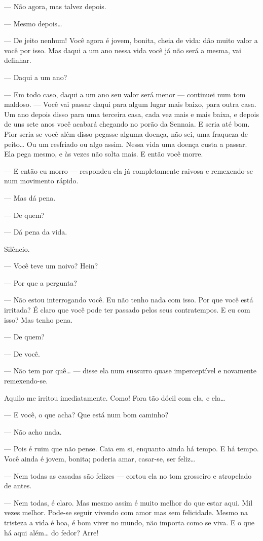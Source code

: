 --- Não agora, mas talvez depois.

--- Mesmo depois\ldots{}

--- De jeito nenhum! Você agora é jovem, bonita, cheia de vida: dão muito
valor a você por isso. Mas daqui a um ano nessa vida você já não será a
mesma, vai definhar.

--- Daqui a um ano?

--- Em todo caso, daqui a um ano seu valor será menor --- continuei num tom
maldoso. --- Você vai passar daqui para algum lugar mais baixo, para
outra casa. Um ano depois disso para uma terceira casa, cada vez mais e
mais baixa, e depois de uns sete anos você acabará chegando no porão da
Sennaia. E seria até bom. Pior seria se você além disso pegasse alguma
doença, não sei, uma fraqueza de peito\ldots{} Ou um resfriado ou algo
assim. Nessa vida uma doença custa a passar. Ela pega mesmo, e às vezes
não solta mais. E então você morre.

--- E então eu morro --- respondeu ela já completamente raivosa e
remexendo-se num movimento rápido.

--- Mas dá pena.

--- De quem?

--- Dá pena da vida.

Silêncio.

--- Você teve um noivo? Hein?

--- Por que a pergunta?

--- Não estou interrogando você. Eu não tenho nada com isso. Por que você
está irritada? É claro que você pode ter passado pelos seus
contratempos. E eu com isso? Mas tenho pena.

--- De quem?

--- De você.

--- Não tem por quê\ldots{} --- disse ela num sussurro quase imperceptível e
novamente remexendo-se.

Aquilo me irritou imediatamente. Como! Fora tão dócil com ela, e ela\ldots{}

--- E você, o que acha? Que está num bom caminho?

--- Não acho nada.

--- Pois é ruim que não pense. Caia em si, enquanto ainda há tempo. E há
tempo. Você ainda é jovem, bonita; poderia amar, casar-se, ser feliz\ldots{}

--- Nem todas as casadas são felizes --- cortou ela no tom grosseiro e
atropelado de antes.

--- Nem todas, é claro. Mas mesmo assim é muito melhor do que estar aqui.
Mil vezes melhor. Pode-se seguir vivendo com amor mas sem felicidade.
Mesmo na tristeza a vida é boa, é bom viver no mundo, não importa como
se viva. E o que há aqui além\ldots{} do fedor? Arre!

